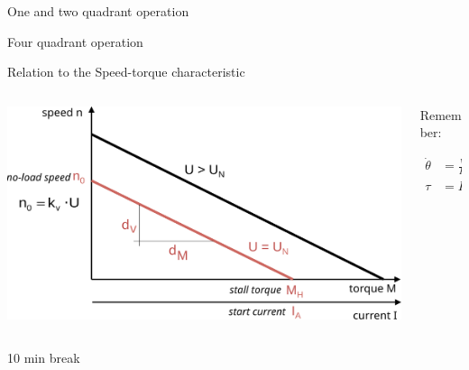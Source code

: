 \documentclass[compress]{beamer}
\makeatletter
\let\beamer@writeslidentry@miniframeson=\beamer@writeslidentry
\def\beamer@writeslidentry@miniframesoff{%
  \expandafter\beamer@ifempty\expandafter{\beamer@framestartpage}{}%
  {%
    \clearpage\beamer@notesactions%
  }
}
\newcommand*{\miniframeson}{\let\beamer@writeslidentry=\beamer@writeslidentry@miniframeson}
\newcommand*{\miniframesoff}{\let\beamer@writeslidentry=\beamer@writeslidentry@miniframesoff}
\makeatother
\begin{document}
{
    \begin{frame}{One and two quadrant operation}
    \end{frame}
}

{
    \begin{frame}{Four quadrant operation}
    \end{frame}
}

\begin{frame}{Relation to the Speed-torque characteristic}

    \begin{columns}
        \begin{column}{0.7\linewidth}
    \begin{center}
        \includegraphics[width=\linewidth]{../part3/figs/voltage-torque}
    \end{center}


        \end{column}
        \begin{column}{0.3\linewidth}
            Remember:

    \begin{align*}
        \dot\theta &= \frac{V}{K} - R \cdot \frac{\tau}{K^2} \\
        \tau &= K \cdot I
    \end{align*}

        \end{column}
    \end{columns}


\end{frame}


\miniframesoff
\begin{frame}[plain]
    \begin{center}
        \Large
        10 min break\\[2em]
    \end{center}
\end{frame}
\miniframeson
\end{document}
